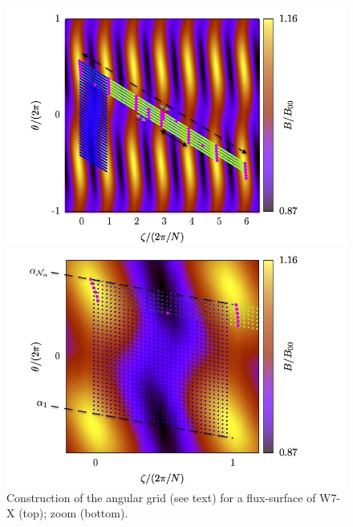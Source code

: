 \begin{figure}\vskip-1.5cm
\centerline{\includegraphics[angle=0,width=\columnwidth]{figures/ang_grid.jpg}}
\centerline{\includegraphics[angle=0,width=\columnwidth]{figures/ang_grid_zoom.jpg}}
\caption{Construction of the angular grid (see text) for a flux-surface of W7-X (top); zoom (bottom).}
\label{FIG_GRID}
\end{figure}


